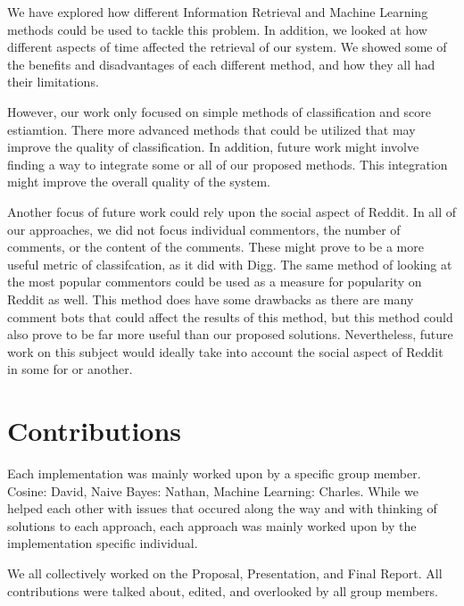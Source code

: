 \documentclass{acm_proc_article-sp}
\begin{document}
We have explored how different Information Retrieval and Machine Learning methods could be used to tackle this problem. In addition, we looked at how different aspects of time affected the retrieval of our system. We showed some of the benefits and disadvantages of each different method, and how they all had their limitations.

However, our work only focused on simple methods of classification and score estiamtion. There more advanced methods that could be utilized that may improve the quality of classification. In addition, future work might involve finding a way to integrate some or all of our proposed methods. This integration might improve the overall quality of the system.

Another focus of future work could rely upon the social aspect of Reddit. In all of our approaches, we did not focus individual commentors, the number of comments, or the content of the comments. These might prove to be a more useful metric of classifcation, as it did with Digg. The same method of looking at the most popular commentors could be used as a measure for popularity on Reddit as well. This method does have some drawbacks as there are many comment bots that could affect the results of this method, but this method could also prove to be far more useful than our proposed solutions. Nevertheless, future work on this subject would ideally take into account the social aspect of Reddit in some for or another.

\section{Contributions}
Each implementation was mainly worked upon by a specific group member. Cosine: David, Naive Bayes: Nathan, Machine Learning: Charles. While we helped each other with issues that occured along the way and with thinking of solutions to each approach, each approach was mainly worked upon by the implementation specific individual. 

We all collectively worked on the Proposal, Presentation, and Final Report. All contributions were talked about, edited, and overlooked by all group members.

%

%
%


\end{document}
